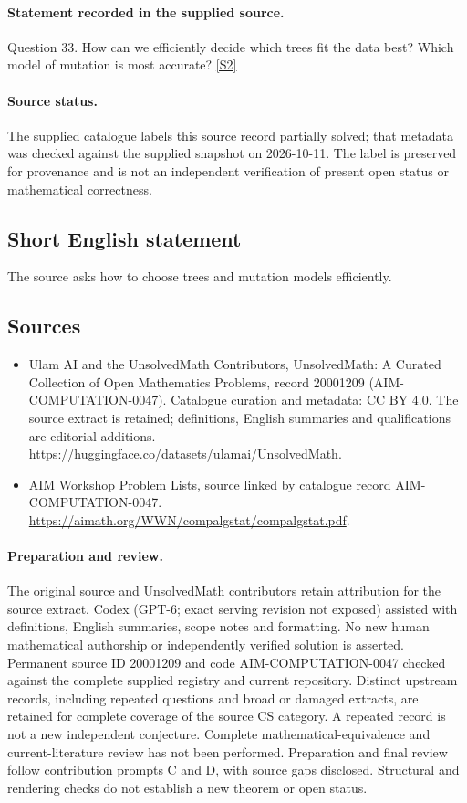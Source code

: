 \documentclass[11pt]{article}
\begin{document}
\paragraph{Statement recorded in the supplied source.}
Question 33. How can we efficiently decide which trees fit the data best? Which model of mutation is most accurate? \href{https://aimath.org/WWN/compalgstat/compalgstat.pdf}{[S2]}
\paragraph{Source status.}
The supplied catalogue labels this source record partially solved; that metadata was checked against the supplied snapshot on 2026-10-11. The label is preserved for provenance and is not an independent verification of present open status or mathematical correctness.
\subsection{Short English statement}
The source asks how to choose trees and mutation models efficiently.
\subsection{Sources}
\begin{itemize}
\item[S1] Ulam AI and the UnsolvedMath Contributors, UnsolvedMath: A Curated Collection of Open Mathematics Problems, record 20001209 (AIM-COMPUTATION-0047). Catalogue curation and metadata: CC BY 4.0. The source extract is retained; definitions, English summaries and qualifications are editorial additions.
\url{https://huggingface.co/datasets/ulamai/UnsolvedMath}.
\item[S2] AIM Workshop Problem Lists, source linked by catalogue record AIM-COMPUTATION-0047.
\url{https://aimath.org/WWN/compalgstat/compalgstat.pdf}.
\end{itemize}
\paragraph{Preparation and review.}
The original source and UnsolvedMath contributors retain attribution for the source extract. Codex (GPT-6; exact serving revision not exposed) assisted with definitions, English summaries, scope notes and formatting. No new human mathematical authorship or independently verified solution is asserted. Permanent source ID 20001209 and code AIM-COMPUTATION-0047 checked against the complete supplied registry and current repository. Distinct upstream records, including repeated questions and broad or damaged extracts, are retained for complete coverage of the source CS category. A repeated record is not a new independent conjecture. Complete mathematical-equivalence and current-literature review has not been performed. Preparation and final review follow contribution prompts C and D, with source gaps disclosed. Structural and rendering checks do not establish a new theorem or open status.
\label{end:20001209}
\end{document}
